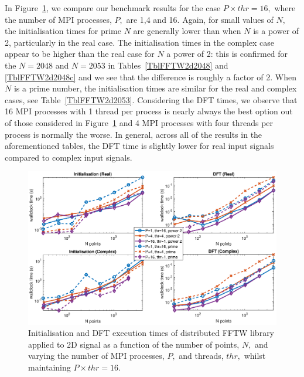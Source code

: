 \documentclass[a4paper]{article}
\begin{document}
In Figure~\ref{2DDistFFTW16}, we compare our benchmark results for the
case $P\times thr=16,$ where the number of MPI processes, $P,$ are 1,4
and 16. Again, for small values of $N,$ the initialisation times for
prime $N$ are generally lower than when $N$ is a power of 2,
particularly in the real case. The initialisation times in the complex
case appear to be higher than the real case for $N$ a power of 2: this
is confirmed for the $N=2048$ and $N=2053$ in
Tables~\ref{TblFFTW2d2048} and \ref{TblFFTW2d2048c} and we see that
the difference is roughly a factor of 2. When $N$ is a prime number,
the initialisation times are similar for the real and complex cases,
see Table~\ref{TblFFTW2d2053}. Considering the DFT times, we observe that
16 MPI processes with 1 thread per process is nearly always the best
option out of those considered in Figure~\ref{2DDistFFTW16} and 4 MPI
processes with four threads per process is normally the worse. In
general, across all of the results in the aforementioned tables, the
DFT time is slightly lower for real input signals compared to complex
input signals.


\begin{figure}[htb]
    \centering
    \includegraphics[width=0.9\linewidth]{../results/fftw_2d_mpi_thr.eps}
  \caption{Initialisation and DFT execution times of distributed FFTW library applied to 2D signal as a function of the
    number of points, $N,$ and varying the number of MPI processes, $P,$ and threads, $thr,$ whilst maintaining $P\times thr=16.$}
  \label{2DDistFFTW16}
\end{figure}
\end{document}

